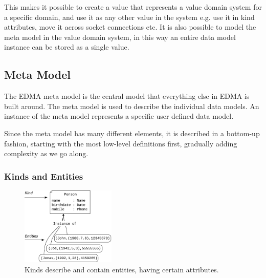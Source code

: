 This makes it possible to create a value that represents a value domain
system for a specific domain, and use it as any other value in the
system e.g. use it in kind attributes, move it across socket connections
etc. It is also possible to model the meta model in the value domain
system, in this way an entire data model instance can be stored as
a single value.


\subsection{\label{sec:MetaModel}Meta Model}

The EDMA meta model is the central model that everything else in EDMA
is built around. The meta model is used to describe the individual
data models. An instance of the meta model represents a specific user
defined data model.

Since the meta model has many different elements, it is described
in a bottom-up fashion, starting with the most low-level definitions
first, gradually adding complexity as we go along.



\subsubsection{Kinds and Entities}

\begin{figure}

	\begin{center}
		\includegraphics[width=0.4\textwidth]{img/kindAndEntities.pdf}
	\end{center}
	\caption{Kinds describe and contain entities, having certain attributes.}
	\label{fig:kindAndEntities}
\end{figure}


